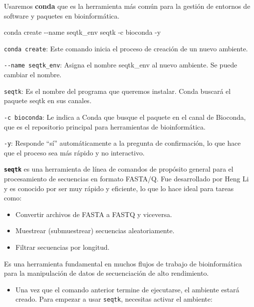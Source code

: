 \documentclass[
]{book}
\newenvironment{Shaded}{\begin{snugshade}}{\end{snugshade}}
\newcommand{\AttributeTok}[1]{\textcolor[rgb]{0.13,0.29,0.53}{#1}}
\newcommand{\ExtensionTok}[1]{#1}
\newcommand{\NormalTok}[1]{#1}
\providecommand{\tightlist}{%
  \setlength{\itemsep}{0pt}\setlength{\parskip}{0pt}}
\begin{document}
Usaremos \textbf{conda} que es la herramienta más común para la gestión de entornos de software y paquetes en bioinformática.

\begin{Shaded}
\begin{Highlighting}[]
\ExtensionTok{conda}\NormalTok{ create }\AttributeTok{{-}{-}name}\NormalTok{ seqtk\_env seqtk }\AttributeTok{{-}c}\NormalTok{ bioconda }\AttributeTok{{-}y}
\end{Highlighting}
\end{Shaded}

\texttt{conda\ create}: Este comando inicia el proceso de creación de un nuevo ambiente.

\texttt{-\/-name\ seqtk\_env}: Asigna el nombre seqtk\_env al nuevo ambiente. Se puede cambiar el nombre.

\texttt{seqtk}: Es el nombre del programa que queremos instalar. Conda buscará el paquete seqtk en sus canales.

\texttt{-c\ bioconda}: Le indica a Conda que busque el paquete en el canal de Bioconda, que es el repositorio principal para herramientas de bioinformática.

\texttt{-y}: Responde ``sí'' automáticamente a la pregunta de confirmación, lo que hace que el proceso sea más rápido y no interactivo.

\textbf{\texttt{seqtk}} es una herramienta de línea de comandos de propósito general para el procesamiento de secuencias en formato FASTA/Q. Fue desarrollado por Heng Li y es conocido por ser muy rápido y eficiente, lo que lo hace ideal para tareas como:

\begin{itemize}
\item
  Convertir archivos de FASTA a FASTQ y viceversa.
\item
  Muestrear (submuestrear) secuencias aleatoriamente.
\item
  Filtrar secuencias por longitud.
\end{itemize}

Es una herramienta fundamental en muchos flujos de trabajo de bioinformática para la manipulación de datos de secuenciación de alto rendimiento.

\begin{itemize}
\tightlist
\item
  Una vez que el comando anterior termine de ejecutarse, el ambiente estará creado. Para empezar a usar \texttt{seqtk}, necesitas activar el ambiente:
\end{itemize}
\end{document}
